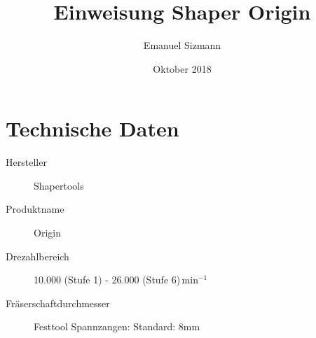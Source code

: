 \documentclass{\basedir/fablab-document}
\date{Oktober 2018}
\author{Emanuel Sizmann}
\title{Einweisung Shaper Origin}
\begin{document}
\dosecttoc
\faketableofcontents
{}




\section{Technische Daten}
\begin{description}
    \item[Hersteller] Shapertools
    \item[Produktname] Origin
    \item[Drezahlbereich] 10.000 (Stufe 1) - 26.000 (Stufe 6)$\,\mathrm{min}^{-1}$
    \item[Fräserschaftdurchmesser] Festtool Spannzangen: Standard: 8mm
    
\end{description}
\end{document}
